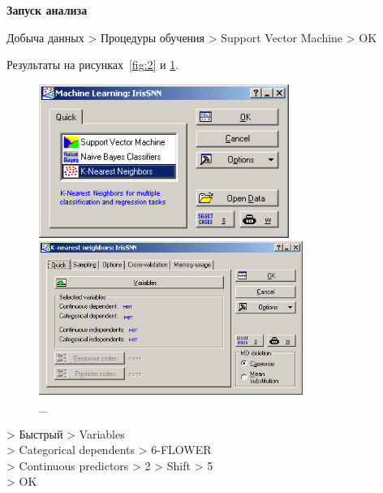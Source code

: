 \newpage

\begin{center}
  \textbf{Запуск анализа}
\end{center}

Добыча данных > Процедуры обучения > Support Vector Machine > OK

Результаты на рисунках~\ref{fig:2} и \ref{fig:3}.

\begin{figure}[!h]
  \centering

  \begin{minipage}{0.49\textwidth}
    \centering

    \includegraphics[height=5cm]
    {inc/ex_2.PNG}

    \caption{\_}

    \label{fig:2}
  \end{minipage}
  \begin{minipage}{0.49\textwidth}
    \centering

    \includegraphics[height=5cm]
    {inc/ex_3.PNG}

    \caption{\_}

    \label{fig:3}
  \end{minipage}
\end{figure}


> Быстрый > Variables \\
> Categorical dependents > 6-FLOWER \\
> Continuous predictors > 2 > Shift > 5 \\
> OK

